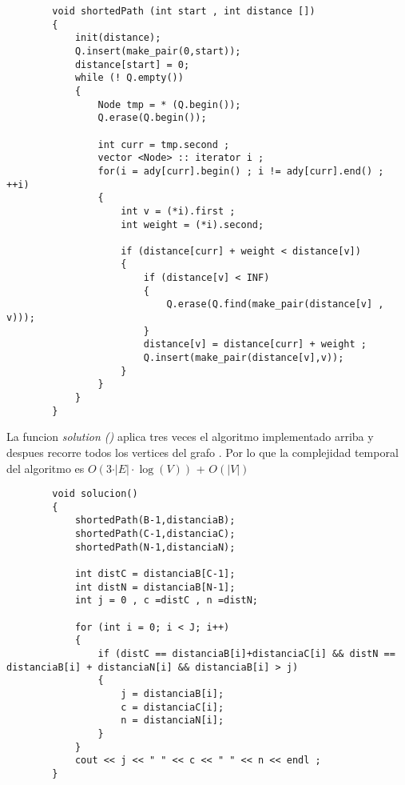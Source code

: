 \documentclass[10pt]{article}
\begin{document}
    \begin{verbatim}
        void shortedPath (int start , int distance []) 
        {
            init(distance);  
            Q.insert(make_pair(0,start)); 
            distance[start] = 0;   
            while (! Q.empty())
            {
                Node tmp = * (Q.begin());  
                Q.erase(Q.begin()); 

                int curr = tmp.second ;  
                vector <Node> :: iterator i ;
                for(i = ady[curr].begin() ; i != ady[curr].end() ; ++i)
                {
                    int v = (*i).first ;    
                    int weight = (*i).second;  

                    if (distance[curr] + weight < distance[v])  
                    {
                        if (distance[v] < INF) 
                        {
                            Q.erase(Q.find(make_pair(distance[v] , v))); 
                        } 
                        distance[v] = distance[curr] + weight ; 
                        Q.insert(make_pair(distance[v],v)); 
                    } 
                }
            }
        }
    \end{verbatim} 


    \noindent La funcion \textit{solution ()} aplica tres veces el algoritmo implementado arriba y despues recorre todos los vertices del grafo . Por lo que 
    la complejidad temporal del algoritmo es $O\left(3 \cdot \vert E \vert \cdot \log \left(V\right)\right)$ + $O\left(\vert V \vert\right) $


    \begin{verbatim}
        void solucion()
        {   
            shortedPath(B-1,distanciaB); 
            shortedPath(C-1,distanciaC); 
            shortedPath(N-1,distanciaN);  

            int distC = distanciaB[C-1]; 
            int distN = distanciaB[N-1]; 
            int j = 0 , c =distC , n =distN; 

            for (int i = 0; i < J; i++)
            {                
                if (distC == distanciaB[i]+distanciaC[i] && distN == distanciaB[i] + distanciaN[i] && distanciaB[i] > j)
                {
                    j = distanciaB[i];  
                    c = distanciaC[i];  
                    n = distanciaN[i]; 
                }
            }            
            cout << j << " " << c << " " << n << endl ; 
        }
    \end{verbatim}
\end{document}
